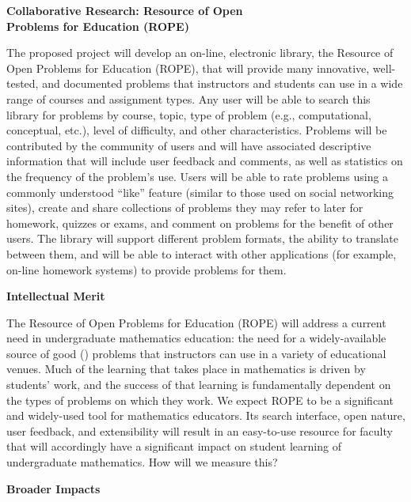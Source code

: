 \documentclass[11pt]{article}
\begin{document}
\begin{center}
{\Large \textbf{Collaborative Research: Resource of Open\\
Problems for Education (ROPE)}}
\end{center}

\bigskip
\noindent
The proposed project will develop an on-line, electronic library, the Resource of Open Problems for Education (ROPE), that will
provide many innovative, well-tested, and documented problems
that instructors and students can use in a wide range of courses and assignment types.  Any user will be able to search this
library for problems by course, topic, type of problem (e.g.,
computational, conceptual, etc.), level of difficulty, and other
characteristics.  Problems will be contributed by the community of users
and will have associated descriptive information that will include user
feedback and comments, as well as statistics on the frequency of the
problem's use.  Users will be able to rate problems using a commonly
understood ``like'' feature (similar to those used on social networking
sites), create and share collections of problems they may refer to later
for homework, quizzes or exams, and comment on problems for the benefit of
other users.  The library will support different problem formats, the
ability to translate between them, and will be able to interact with other
applications (for example, on-line homework systems) to provide problems
for them.

\bigskip\bigskip
\noindent
{\large \textbf{Intellectual Merit}}

The Resource of Open Problems for Education (ROPE) will address a current need in
undergraduate mathematics education: the need for a widely-available
source of good ({\color{red}{what do we mean by ``good"?}}) problems that instructors can use in a variety of
educational venues.  Much of the learning that takes place in mathematics
is driven by students' work, and the success of that learning is
fundamentally dependent on the types of problems on which they work.  We expect ROPE to be a significant and widely-used tool for
mathematics educators.  Its search interface, open nature, user feedback,
and extensibility will result in an easy-to-use resource for faculty that will 
accordingly have a significant impact on student learning of undergraduate
mathematics. {\color{red} How will we measure this?}

\bigskip\bigskip
\noindent
{\large \textbf{Broader Impacts}}
\end{document}
